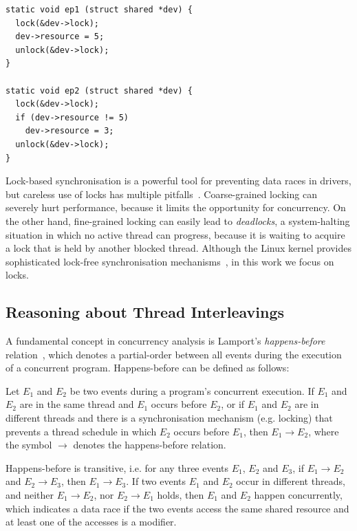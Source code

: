 \begin{lstlisting}[caption = Using locks to eliminate the data race, label = fig:lock_example]
static void ep1 (struct shared *dev) {
  lock(&dev->lock);
  dev->resource = 5;
  unlock(&dev->lock);
}

static void ep2 (struct shared *dev) {
  lock(&dev->lock);
  if (dev->resource != 5)
    dev->resource = 3;
  unlock(&dev->lock);
}
\end{lstlisting}

Lock-based synchronisation is a powerful tool for preventing data races in drivers, but careless use of locks has multiple pitfalls~\cite{sutter2005software}. Coarse-grained locking can severely hurt performance, because it limits the opportunity for concurrency. On the other hand, fine-grained locking can easily lead to \emph{deadlocks}, a system-halting situation in which no active thread can progress, because it is waiting to acquire a lock that is held by another blocked thread. Although the Linux kernel provides sophisticated lock-free synchronisation mechanisms~\cite{corbet2005linux}, in this work we focus on locks.

\subsection{Reasoning about Thread Interleavings}
\label{bg:happensbefore}

A fundamental concept in concurrency analysis is Lamport's \emph{happens-before} relation~\cite{lamport1978time}, which denotes a partial-order between all events during the execution of a concurrent program. Happens-before can be defined as follows:

\begin{definition}
\label{definition:datarace}
Let $E_1$ and $E_2$ be two events during a program's concurrent execution. If $E_1$ and $E_2$ are in the same thread and $E_1$ occurs before $E_2$, or if $E_1$ and $E_2$ are in different threads and there is a synchronisation mechanism (e.g. locking) that prevents a thread schedule in which $E_2$ occurs before $E_1$, then $E_1 \rightarrow E_2$, where the symbol $\rightarrow$ denotes the happens-before relation.
\end{definition}

Happens-before is transitive, i.e. for any three events $E_1$, $E_2$ and $E_3$, if $E_1 \rightarrow E_2$ and $E_2 \rightarrow E_3$, then $E_1 \rightarrow E_3$. If two events $E_1$ and $E_2$ occur in different threads, and neither $E_1 \rightarrow E_2$, nor $E_2 \rightarrow E_1$ holds, then $E_1$ and $E_2$ happen concurrently, which indicates a data race if the two events access the same shared resource and at least one of the accesses is a modifier.

